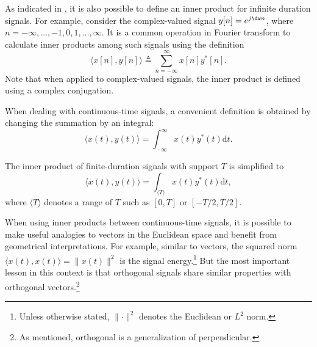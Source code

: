 As indicated in , it is also possible to define an inner product for infinite duration signals. For example, consider the complex-valued signal $y[n]=e^{j \dw n}$, where $n=-\infty,\ldots,-1,0,1,\ldots,\infty$. It is a common operation in Fourier transform to calculate inner products among such signals using the definition
\begin{equation}
\langle x[n],y[n]\rangle \triangleq  \sum_{n=-\infty}^\infty x[n]y^*[n].
\label{eq:inner_product_infinite_vectors}
\end{equation}
Note that when applied to complex-valued signals, the inner product is defined using a complex conjugation.


When dealing with continuous-time signals, a convenient definition is obtained by changing the summation by an integral:
\begin{equation}
\langle x(t),y(t)\rangle = \int_{-\infty}^\infty x(t)y^*(t) \textrm{d}t.
\label{eq:innerprod_signals}
\end{equation}

The inner product of finite-duration signals with support $T$ is simplified to
\begin{equation}
\langle x(t),y(t)\rangle = \int_{\langle T\rangle} x(t)y^*(t) \textrm{d}t,
\label{eq:innerprod_signals_finite_duration}
\end{equation}
where $\langle T\rangle$ denotes a range of $T$ such as $[0,T]$ or $[-T/2,T/2]$.

When using inner products between continuous-time signals, it is possible to make useful analogies to vectors in the Euclidean space and benefit from geometrical interpretations.
For example, similar to vectors, the squared norm $\langle x(t),x(t)\rangle = \lVert x(t)\rVert^2$ is the signal energy.\footnote{Unless otherwise stated, $\lVert \cdot \rVert^2$ denotes the Euclidean or $L^2$ norm.}
But the most important lesson in this context is that orthogonal signals share similar properties with orthogonal vectors.\footnote{As mentioned, orthogonal is a generalization of perpendicular.}

